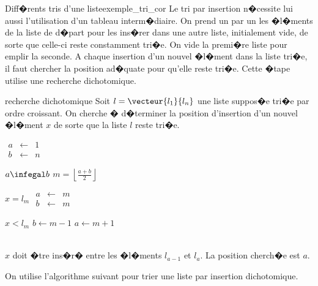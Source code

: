 \begin{xexempleprog2}{Diff�rents tris d'une liste}{exemple_tri_cor}
Le tri par insertion n�cessite lui aussi l'utilisation d'un tableau interm�diaire. On prend un par un les �l�ments de la liste de d�part pour les ins�rer dans une autre liste, initialement vide, de sorte que celle-ci reste constamment tri�e. On vide la premi�re liste pour emplir la seconde. A chaque insertion d'un nouvel �l�ment dans la liste tri�e, il faut chercher la position ad�quate pour qu'elle reste tri�e. Cette �tape utilise une recherche dichotomique. 

            \begin{xalgorithm}{recherche dichotomique}\label{recherche_dicho_algo}
            Soit $l = \vecteur{l_1}{l_n}$ une liste suppos�e tri�e par ordre croissant. On cherche � 
            d�terminer la position d'insertion d'un nouvel �l�ment $x$ de sorte que la liste $l$
            reste tri�e.
            
            $\begin{array}{lll}
            a &\longleftarrow& 1 \\
            b &\longleftarrow& n 
            \end{array}$ \\
            \begin{xwhile2}{$a \infegal b$}
                    $m = \left\lfloor \frac{a+b}{2}\right\rfloor$ \\
                    \begin{xif}{$ x = l_m$}
                        $\begin{array}{lll}
                        a &\longleftarrow& m \\
                        b &\longleftarrow& m 
                        \end{array}$
                    \xelse
                            \begin{xif}{$x < l_m$}
                                $b \longleftarrow m-1$
                            \xelse
                                $a \longleftarrow m +1$
                            \end{xif}
                    \end{xif}
            \end{xwhile2} \\
            $x$ doit �tre ins�r� entre les �l�ments $l_{a-1}$ et $l_a$. La position cherch�e est $a$.
            \end{xalgorithm}
                            
On utilise l'algorithme suivant pour trier une liste par insertion dichotomique. 
                            

\end{xexempleprog2}
